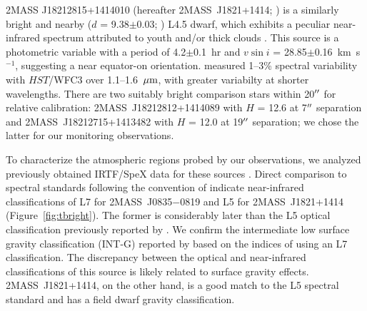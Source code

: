 \documentclass[twocolumn]{aastex6}
\newcommand{\kms}{km~s$^{-1}$}
\newcommand{\sha}{2MASS~J0835$-$0819}
\newcommand{\shb}{2MASS~J1821+1414}
\begin{document}
2MASS J18212815+1414010 (hereafter {\shb}; \citealt{2008ApJ...686..528L}) is a similarly bright and nearby ($d$ = 9.38$\pm$0.03; \citealt{2016MNRAS.455..357S}) L4.5 dwarf, which exhibits a peculiar near-infrared spectrum attributed to youth and/or thick clouds \citep{2008ApJ...686..528L,2015ApJS..219...33G,2016ApJ...833...96L}.
This source is a photometric variable with a period of 4.2$\pm$0.1~hr \citep{2015ApJ...799..154M} and $v\sin{i}$ = 28.85$\pm$0.16~{\kms}, suggesting a near equator-on orientation.  \citet{2015ApJ...798L..13Y} measured 1--3\% spectral variability with $HST$/WFC3 over 1.1--1.6~$\mbox{$\mu$m}$, with greater variabilty at shorter wavelengths.
There are two suitably bright comparison stars within 20$\mbox{$^{\prime\prime}$}$ for relative calibration: 2MASS~J18212812+1414089 with $H$ = 12.6 at 7$\mbox{$^{\prime\prime}$}$ separation and 2MASS~J18212715+1413482 with $H$ = 12.0 at 19$\mbox{$^{\prime\prime}$}$ separation; we chose the latter for our monitoring observations.

To characterize the atmospheric regions probed by our observations, we analyzed previously 
obtained IRTF/SpeX data for these sources \citep{2008ApJ...686..528L,2010ApJ...710.1142B}.
Direct comparison to spectral standards following the convention of \citet{2010ApJS..190..100K} indicate near-infrared
classifications of L7 for {\sha} and L5 for {\shb} (Figure~\ref{fig:tbright}). The former is considerably later than the L5 optical classification previously reported by \citet{2003AJ....126.2421C}. We confirm the intermediate low surface gravity classification (INT-G) reported by \citet{2016ApJ...833...96L} based on the indices of \citet{2013ApJ...772...79A} using an L7 classification. The discrepancy between the optical and near-infrared classifications of this source is likely related to surface gravity effects. {\shb}, on the other hand, is a good match to the L5 spectral standard and has a field dwarf gravity classification.
\end{document}
